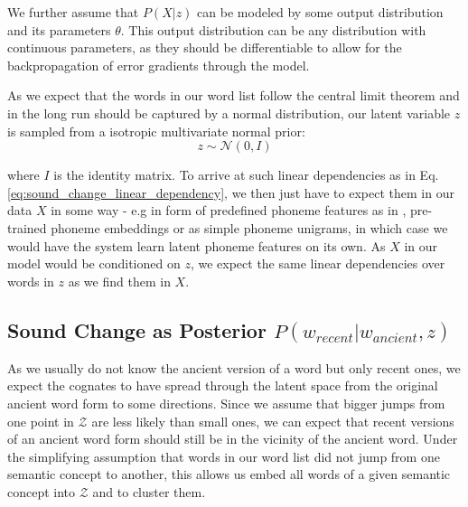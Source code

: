 \documentclass[6pt]{article}
\begin{document}
We further assume that $P(X|z)$ can be modeled by some output distribution and its parameters $\theta$.  This output distribution can be any distribution with continuous parameters, as they should be differentiable to allow for the backpropagation of error gradients through the model. 
%

As we expect that the words in our word list follow the central limit theorem and in the long run should be captured by a normal distribution, our latent variable $z$ is sampled from a isotropic multivariate normal prior:
\begin{equation}
z \sim \mathcal{N}(0,I)
\end{equation}

where $I$ is the identity matrix.
To arrive at such linear dependencies as in Eq. \ref{eq:sound_change_linear_dependency}, we then just have to expect them in our data $X$ in some way - e.g in form of predefined phoneme features as in \cite{kondrak2000new,list2012sca,rama2016siamese}, pre-trained phoneme embeddings or as simple phoneme unigrams, in which case we would have the system learn latent phoneme features on its own. As $X$ in our model would be conditioned on $z$, we expect the same linear dependencies over words in $z$ as we find them in $X$.


\subsection{Sound Change as Posterior $P(w_{recent}|w_{ancient},z)$ }


As we usually do not know the ancient version of a word but only recent ones, we expect the cognates to have spread through the latent space from the original ancient word form to some directions. Since we assume that bigger jumps from one point in $\mathcal{Z}$ are less likely than small ones, we can expect that recent versions of an ancient word form should still be in the vicinity of the ancient word. Under the simplifying assumption that words in our word list did not jump from one semantic concept to another, this allows us embed all words of a given semantic concept into $\mathcal{Z}$ and to cluster them.
\end{document}

